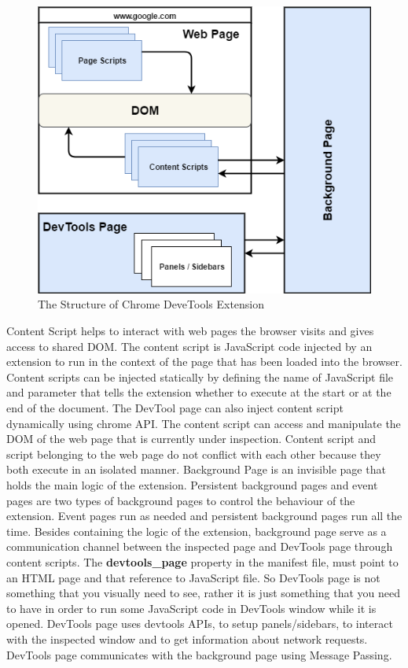 \begin{figure}[!h]
	\centering
	\includegraphics[scale=0.5,trim=0 0 0 0]{gfx/ChromeDevToolsExtension.png}
	\caption{The Structure of Chrome DeveTools Extension}
	\label{fig:structure_of_chrome_devtools_extension}
\end{figure} 
Content Script helps to interact with web pages the browser visits and gives access to shared DOM. The content script is JavaScript code injected by an extension to run in the context of the page that has been loaded into the browser. Content scripts can be injected statically by defining the name of JavaScript file and parameter that tells the extension whether to execute at the start or at the end of the document. The DevTool page can also inject content script dynamically using chrome API. The content script can access and manipulate the DOM of the web page that is currently under inspection. Content script and script belonging to the web page do not conflict with each other because they both execute in an isolated manner.
Background Page is an invisible page that holds the main logic of the extension. Persistent background pages and event pages are two types of background pages to control the behaviour of the extension. Event pages run as needed and persistent background pages run all the time. Besides containing the logic of the extension, background page serve as a communication channel between the inspected page and DevTools page through content scripts.  
The \textbf{devtools\_page} property in the manifest file, must point to an HTML page and that reference to JavaScript file. So DevTools page is not something that you visually need to see, rather it is just something that you need to have in order to run some JavaScript code in DevTools window while it is opened. DevTools page uses devtools APIs, to setup panels/sidebars, to interact with the inspected window and to get information about network requests. DevTools page communicates with the background page using Message Passing.

